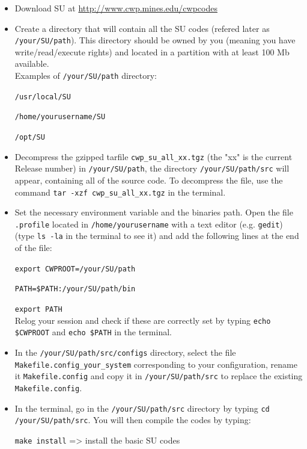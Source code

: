 \documentclass[twoside,a4paper]{article}
\begin{document}
\begin{itemize}
\setlength\itemsep{2ex}
\setlength{\parindent}{5ex}
\item Download SU at \url{http://www.cwp.mines.edu/cwpcodes}

\item Create a directory that will contain all the SU codes (refered later as \verb|/your/SU/path|). This directory should be owned by you (meaning you have write/read/execute rights) and located in a partition with at least 100 Mb available.\\[1ex]
Examples of \verb|/your/SU/path| directory:

\verb|/usr/local/SU|

\verb|/home/yourusername/SU|

\verb|/opt/SU|

\item Decompress the gzipped tarfile \verb|cwp_su_all_xx.tgz| (the "xx" is the current Release number) in \verb|/your/SU/path|, the directory \verb|/your/SU/path/src| will appear, containing all of the source code. To decompress the file, use the command \verb|tar -xzf cwp_su_all_xx.tgz| in the terminal.


\item Set the necessary environment variable and the binaries path. Open the file \verb|.profile| located in \verb|/home/yourusername| with a text editor (e.g. \verb|gedit|) (type \verb|ls -la| in the terminal to see it) and add the following lines at the end of the file:

\verb|export CWPROOT=/your/SU/path|

\verb|PATH=$PATH:/your/SU/path/bin|

\verb|export PATH|\\[1ex]
Relog your session and check if these are correctly set by typing \verb|echo $CWPROOT| and \verb|echo $PATH| in the terminal.

\item In the \verb|/your/SU/path/src/configs| directory, select the file \verb|Makefile.config_your_system| corresponding to your configuration, rename it \verb|Makefile.config| and copy it in \verb|/your/SU/path/src| to replace the existing \verb|Makefile.config|.

\item In the terminal, go in the \verb|/your/SU/path/src| directory by typing \verb|cd /your/SU/path/src|. You will then compile the codes by typing:

\verb|make install| => install the basic SU codes


\end{itemize}
\end{document}
